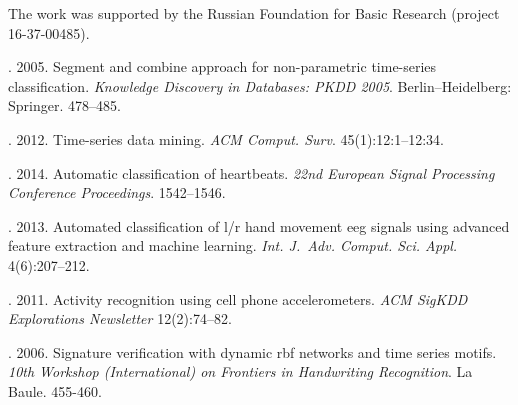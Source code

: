 



\Ack
\noindent
The work was supported by the Russian Foundation for Basic Research 
(project 16-37-00485).

\pagebreak


  \begin{multicols}{2}

\renewcommand{\bibname}{\protect\rmfamily References}

{\small\frenchspacing
 {%
 \begin{thebibliography}{99}

.
2005.
 Segment and combine approach for non-parametric time-series classification.
\textit{Knowledge Discovery in Databases: PKDD 2005}. 
Berlin--Heidelberg: Springer. 478--485.

.
2012.
Time-series data mining.
\textit{ACM Comput. Surv}. 45(1):12:1--12:34.

.
2014.
Automatic classification of heartbeats.
\textit{22nd European Signal Processing Conference Proceedings}. 1542--1546.

.
2013.
Automated classification of l/r hand movement eeg signals using advanced feature extraction and machine learning.
\textit{Int. J.~Adv. Comput. Sci. Appl.} 4(6):207--212.

.
2011.
Activity recognition using cell phone accelerometers.
\textit{ACM SigKDD Explorations Newsletter} 12(2):74--82.

.
2006.
 Signature verification with dynamic rbf networks and time series motifs.
\textit{10th  Workshop (International) on Frontiers in Handwriting Recognition}.
 La Baule. 455-460.


\end{thebibliography}}}
\end{multicols}
